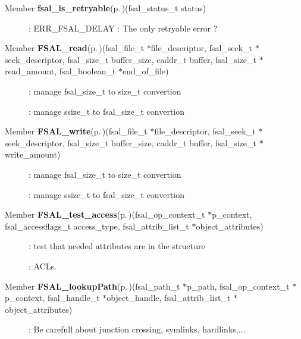 \label{todo__todo000006}
 \begin{description}
\item[Member {\bf fsal\_\-is\_\-retryable}{\rm (p.\,\pageref{fsal__errors_8c_a0})}(fsal\_\-status\_\-t status) ]: ERR\_\-FSAL\_\-DELAY : The only retryable error ?\end{description}


\label{todo__todo000007}
 \begin{description}
\item[Member {\bf FSAL\_\-read}{\rm (p.\,\pageref{fsal__fileop_8c_a2})}(fsal\_\-file\_\-t $\ast$file\_\-descriptor, fsal\_\-seek\_\-t $\ast$seek\_\-descriptor, fsal\_\-size\_\-t buffer\_\-size, caddr\_\-t buffer, fsal\_\-size\_\-t $\ast$read\_\-amount, fsal\_\-boolean\_\-t $\ast$end\_\-of\_\-file) ]: manage fsal\_\-size\_\-t to size\_\-t convertion 

: manage ssize\_\-t to fsal\_\-size\_\-t convertion\end{description}


\label{todo__todo000008}
 \begin{description}
\item[Member {\bf FSAL\_\-write}{\rm (p.\,\pageref{fsal__fileop_8c_a3})}(fsal\_\-file\_\-t $\ast$file\_\-descriptor, fsal\_\-seek\_\-t $\ast$seek\_\-descriptor, fsal\_\-size\_\-t buffer\_\-size, caddr\_\-t buffer, fsal\_\-size\_\-t $\ast$write\_\-amount) ]: manage fsal\_\-size\_\-t to size\_\-t convertion 

: manage ssize\_\-t to fsal\_\-size\_\-t convertion\end{description}


\label{todo__todo000009}
 \begin{description}
\item[Member {\bf FSAL\_\-test\_\-access}{\rm (p.\,\pageref{fsal__local__op_8c_a0})}(fsal\_\-op\_\-context\_\-t $\ast$p\_\-context, fsal\_\-accessflags\_\-t access\_\-type, fsal\_\-attrib\_\-list\_\-t $\ast$object\_\-attributes) ]: test that needed attributes are in the structure 

: ACLs.\end{description}


\label{todo__todo000010}
 \begin{description}
\item[Member {\bf FSAL\_\-lookup\-Path}{\rm (p.\,\pageref{fsal__lookup_8c_a2})}(fsal\_\-path\_\-t $\ast$p\_\-path, fsal\_\-op\_\-context\_\-t $\ast$p\_\-context, fsal\_\-handle\_\-t $\ast$object\_\-handle, fsal\_\-attrib\_\-list\_\-t $\ast$object\_\-attributes) ]: Be carefull about junction crossing, symlinks, hardlinks,...\end{description}
